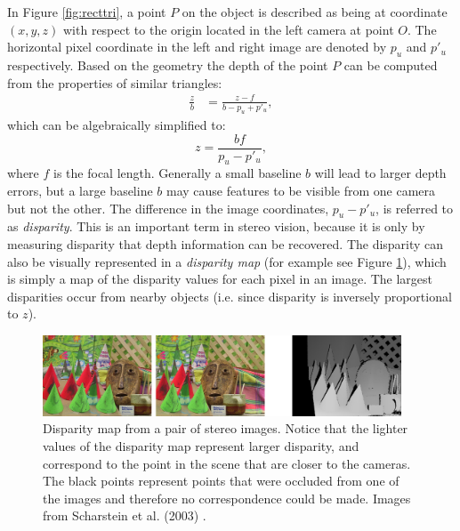 In Figure \ref{fig:recttri}, a point $P$ on the object is described as being at coordinate $(x,y,z)$ with respect to the origin located in the left camera at point $O$. The horizontal pixel coordinate in the left and right image are denoted by $p_u$ and $p'_u$ respectively. Based on the geometry the depth of the point $P$ can be computed from the properties of similar triangles:
\begin{align}
  \frac{z}{b} &= \frac{z-f}{b-p_u+p'_u},
\end{align}
which can be algebraically simplified to:
\begin{equation}
    z = \frac{bf}{p_u-p'_u},
\end{equation}
where $f$ is the focal length. Generally a small baseline $b$ will lead to larger depth errors, but a large baseline $b$ may cause features to be visible from one camera but not the other. The difference in the image coordinates, $p_u-p'_u$, is referred to as \textit{disparity}. This is an important term in stereo vision, because it is only by measuring disparity that depth information can be recovered. The disparity can also be visually represented in a \textit{disparity map} (for example see Figure \ref{fig:disparity}), which is simply a map of the disparity values for each pixel in an image. The largest disparities occur from nearby objects (i.e. since disparity is inversely proportional to $z$).
\begin{figure}[ht]
\centering
\includegraphics[width=0.95\textwidth]{tex/figs/ch10_figs/disparitymap.png}
\caption{Disparity map from a pair of stereo images. Notice that the lighter values of the disparity map represent larger disparity, and correspond to the point in the scene that are closer to the cameras. The black points represent points that were occluded from one of the images and therefore no correspondence could be made. Images from Scharstein et al. (2003) \nocite{ScharsteinSzeliski2003}.}
\label{fig:disparity}
\end{figure}

